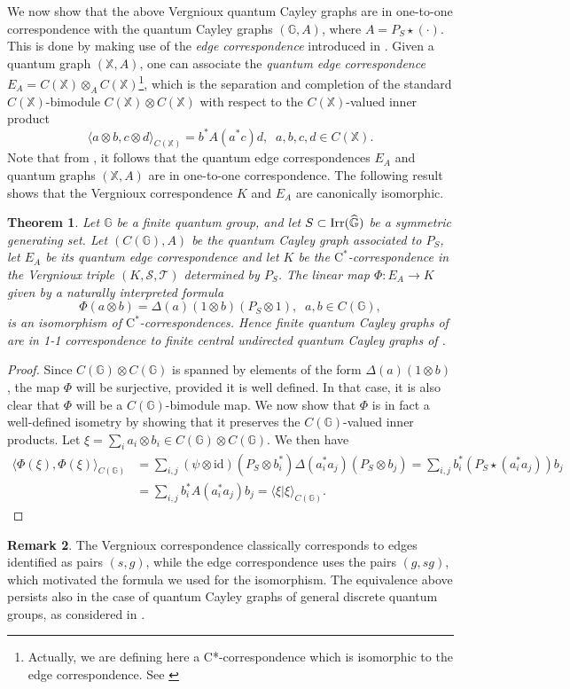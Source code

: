\documentclass[12pt]{amsart}
\newtheorem{thm}{Theorem}[section]
\theoremstyle{definition}
\theoremstyle{definition}
\theoremstyle{definition}
\theoremstyle{definition}
\newtheorem{remark}[thm]{Remark}
\newcommand{\id}{\mathrm{id}}
\newcommand{\G}{\mathbb{G}}
\newcommand{\X}{\mathbb{X}}
\newcommand{\Cst}{\textrm{C}^\ast}
\newcommand{\mc}[1]{\mathcal{#1}}
\numberwithin{equation}{section}
\begin{document}
We now show that the above Vergnioux quantum Cayley graphs are in one-to-one correspondence with the quantum Cayley graphs $(\G, A)$, where $A= P_S \star (\cdot)$.  This is done by making use of the {\it edge correspondence}  introduced in \cite{BHINW23}. Given a quantum graph $(\X,A)$, one can associate the {\it quantum edge correspondence} $E_A = C(\X) \otimes_A C(\X)$\footnote{Actually, we are defining here a C*-correspondence which is isomorphic to the edge correspondence.  See \cite[Corollary 2.6]{BHINW23}}, which is the separation and completion of the standard $C(\X)$-bimodule $C(\X) \otimes C(\X)$ with respect to the $C(\X)$-valued inner product 
\[
\langle a \otimes b, c \otimes d\rangle_{C(\X)} = b^*A(a^*c)d, \;\; a,b,c,d \in C(\X).
\]
Note that from \cite[Theorem 2.5 and Corollary 2.6]{BHINW23}, it follows that the quantum edge correspondences $E_A$ and quantum graphs $(\X,A)$ are in one-to-one correspondence. The following result shows that the Vergnioux correspondence $K$ and $E_A$ are canonically isomorphic.    
\begin{thm}\label{correspondence-isomorphism}
Let $\G$ be a finite quantum group, and let $S\subset  \textup{Irr}(\widehat{\G})$ be a symmetric generating set. Let $(C(\G), A)$ be the quantum Cayley graph associated to $P_S$, let $E_A$ be its quantum edge correspondence and let $K$ be the $\Cst$-correspondence in the Vergnioux triple $(K,\mc S, \mc T)$ determined by $P_S$.
The linear map $\Phi:E_A \to K$ given by a naturally interpreted formula
\[
\Phi(a\otimes b) = \Delta(a)(1 \otimes b)(P_S \otimes 1), \;\; a, b \in C(\G),
\]
is an isomorphism of $\Cst$-correspondences. Hence finite quantum Cayley graphs of \cite{Ver05} are in 1-1 correspondence to finite central undirected quantum Cayley graphs of \cite{Was24}.
\end{thm}

\begin{proof}
Since $C(\G) \otimes C(\G)$ is spanned by elements of the form $\Delta(a)(1 \otimes b)$, the map $\Phi$ will be surjective, provided it is well defined.  In that case, it is also clear that $\Phi$ will be a $C(\G)$-bimodule map. We now show that $\Phi$ is in fact a well-defined isometry by showing that it preserves the $C(\G)$-valued inner products.  Let $\xi = \sum_i a_i \otimes b_i \in C(\G) \otimes C(\G)$. We then have 
\begin{align*}
\langle \Phi(\xi), \Phi(\xi) \rangle_{C(\G)} &= \sum_{i,j} (\psi \otimes \id) (P_S \otimes b_i^*)\Delta(a_i^*a_j)(P_S \otimes b_j) = \sum_{i,j} b_i^* (P_S\star (a_i^*a_j)) b_j \\
&=\sum_{i,j} b_i^* A(a_i^*a_j) b_j = \langle \xi | \xi \rangle_{C(\G)}. 
\end{align*}
\end{proof}
\begin{remark}
The Vergnioux correspondence classically corresponds to edges identified as pairs $(s,g)$, while the edge correspondence uses the pairs $(g,sg)$, which motivated the formula we used for the isomorphism. The equivalence above persists also in the case of quantum Cayley graphs of general discrete quantum groups, as considered in \cite{Was24}.
\end{remark}
\end{document}
